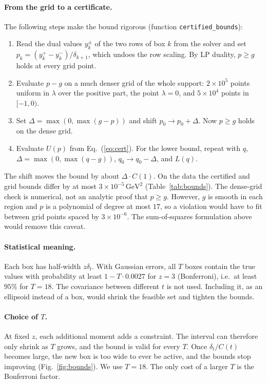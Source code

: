 \documentclass[11pt]{article}
\theoremstyle{remark}
\begin{document}
\paragraph{From the grid to a certificate.} The following steps make the bound rigorous (function \texttt{certified\_bounds}):
\begin{enumerate}[leftmargin=*,itemsep=1pt]
\item Read the dual values $y^\pm_k$ of the two rows of box $k$ from the solver and set $p_k=(y^+_k-y^-_k)/\delta_{k+1}$, which undoes the row scaling.
      By LP duality, $p\ge g$ holds at every grid point.
\item Evaluate $p-g$ on a much denser grid of the whole support: $2\times10^5$ points uniform in $\lambda$ over the positive part, the point $\lambda=0$, and $5\times10^4$ points in $[-1,0)$.
\item Set $\Delta=\max(0,\max(g-p))$ and shift $p_0\to p_0+\Delta$. Now $p\ge g$ holds on the dense grid.
\item Evaluate $U(p)$ from Eq.~(\ref{eq:cert}). For the lower bound, repeat with $q$, $\Delta=\max(0,\max(q-g))$, $q_0\to q_0-\Delta$, and $L(q)$.
\end{enumerate}
The shift moves the bound by about $\Delta\cdot C(1)$. On the data the certified and grid bounds differ by at most $3\times10^{-5}\,\mathrm{GeV}^2$ (Table~\ref{tab:bounds}).
The dense-grid check is numerical, not an analytic proof that $p\ge g$. However, $g$ is smooth in each region and $p$ is a polynomial of degree at most $17$, so a violation would have to fit
between grid points spaced by $3\times10^{-6}$. The sum-of-squares formulation above would remove this caveat.

\paragraph{Statistical meaning.} Each box has half-width $z\delta_t$. With Gaussian errors, all $T$ boxes contain the true values with probability at least
$1-T\cdot0.0027$ for $z=3$ (Bonferroni), i.e.\ at least $95\%$ for $T=18$. The covariance between different $t$ is not used. Including it, as an ellipsoid instead of a box, would shrink the feasible set
and tighten the bounds.

\paragraph{Choice of $T$.} At fixed $z$, each additional moment adds a constraint. The interval can therefore only shrink as $T$ grows, and the bound is valid for every $T$.
Once $\delta_t/C(t)$ becomes large, the new box is too wide to ever be active, and the bounds stop improving (Fig.~\ref{fig:bounds}). We use $T=18$. The only cost of a larger $T$ is the Bonferroni factor.
\end{document}

